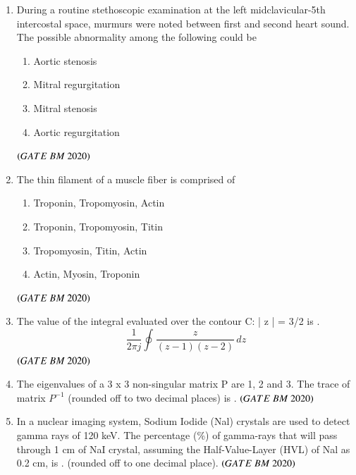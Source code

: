 \documentclass[journal,12pt,onecolumn]{IEEEtran}
\theoremstyle{remark}
\begin{document}
\begin{enumerate}
\item During a routine stethoscopic examination at the left midclavicular-5th intercostal space, murmurs were noted between first and second heart sound. The possible abnormality among the following could be
\begin{enumerate}[label=\alph*)] 
\item\hspace{0.5cm}Aortic stenosis
\item\hspace{0.5cm}Mitral regurgitation
\item\hspace{0.5cm}Mitral stenosis
\item\hspace{0.5cm}Aortic regurgitation
\end{enumerate}
 \hfill $\brak{GATE\ BM\ 2020}$\\
 
\item The thin filament of a muscle fiber is comprised of
\begin{enumerate}[label=\alph*)] 
\item\hspace{0.5cm}Troponin, Tropomyosin, Actin
\item\hspace{0.5cm}Troponin, Tropomyosin, Titin
\item\hspace{0.5cm}Tropomyosin, Titin, Actin
\item\hspace{0.5cm}Actin, Myosin, Troponin
\end{enumerate}
 \hfill $\brak{GATE\ BM\ 2020}$\\
 
\item The value of the integral evaluated over the contour C: | z | = 3/2 is \underline{\hspace{2cm}}.\\
\[
\frac{1}{2\pi j} \oint_{ {}{}} \frac{z}{(z - 1)(z - 2)}\, dz
\]  \hfill $\brak{GATE\ BM\ 2020}$\\

\item The eigenvalues of a 3 x 3 non-singular matrix P are 1, 2 and 3. The trace of matrix \( P^{-1} \) (rounded off to two decimal places) is \underline{\hspace{2cm}}.
 \hfill $\brak{GATE\ BM\ 2020}$\\
 
\item In a nuclear imaging system, Sodium Iodide (Nal) crystals are used to detect gamma rays of 120 keV. The percentage (\%)
of gamma-rays that will pass through 1 cm of NaI crystal, assuming the Half-Value-Layer (HVL) of Nal as 0.2 cm, is \underline{\hspace{2cm}}.
(rounded off to one decimal place).
 \hfill $\brak{GATE\ BM\ 2020}$\\
 

\end{enumerate}
\end{document}

